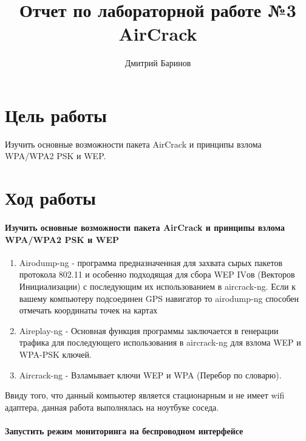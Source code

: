 \documentclass[10pt,a4paper]{article}
\author{Дмитрий Баринов}
\title{Отчет по лабораторной работе №3 AirCrack}
\begin{document}
\maketitle

\newpage

\section{Цель работы}
Изучить основные возможности пакета AirCrack и принципы взлома WPA/WPA2 PSK и WEP.
\section{Ход работы}

\paragraph{Изучить основные возможности пакета AirCrack и принципы взлома WPA/WPA2 PSK и WEP}

\begin{enumerate}
\item Airodump-ng - программа предназначенная для захвата сырых пакетов протокола 802.11 и особенно подходящая для сбора WEP IVов (Векторов Инициализации) с последующим их использованием в aircrack-ng. Если к вашему компьютеру подсоединен GPS навигатор
то airodump-ng способен отмечать координаты точек на картах

\item Aireplay-ng - Основная функция программы заключается в генерации трафика для последующего использования в aircrack-ng для взлома WEP и WPA-PSK ключей.

\item Aircrack-ng - Взламывает ключи WEP и WPA (Перебор по словарю).
\end{enumerate}


Ввиду того, что данный компьютер является стационарным и не имеет wifi адаптера, данная работа выполнялась на ноутбуке соседа.

\paragraph{Запустить режим мониторинга на беспроводном интерфейсе}
\end{document}
